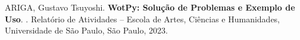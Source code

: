 
\setlength{\absparsep}{18pt} %
\begin{resumo}

% 
%
% 
%
\begin{flushleft}
ARIGA, Gustavo Tsuyoshi. \textbf{WotPy: Solução de Problemas e Exemplo de Uso}. \imprimirdata. \pageref{LastPage} Relatório de Atividades – Escola de Artes, Ciências e Humanidades, Universidade de São Paulo, São Paulo, 2023. \end{flushleft}



\end{resumo}
